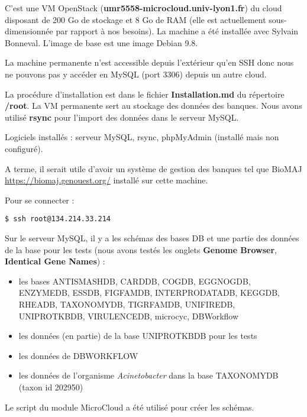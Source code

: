 C'est une VM OpenStack (\textbf{umr5558-microcloud.univ-lyon1.fr}) du cloud  disposant de 200 Go de stockage et 8 Go de RAM (elle est actuellement sous-dimensionnée par rapport à nos besoins). La machine a été installée avec Sylvain Bonneval. L'image de base est une image Debian 9.8.

La machine permanente n'est accessible depuis l'extérieur qu'en SSH donc nous ne pouvons pas y accéder en MySQL (port 3306) depuis un autre cloud.
\newline

La procédure d'installation est dans le fichier \textbf{Installation.md} du répertoire \textbf{/root}. La VM permanente sert au stockage des données des banques. Nous avons utilisé \textbf{rsync} pour l'import des données dans le serveur MySQL.
\newline

Logiciels installés : serveur MySQL, rsync, phpMyAdmin (installé mais non configuré). 
\newline

A terme, il serait utile d'avoir un système de gestion des banques tel que BioMAJ \url{https://biomaj.genouest.org/} installé sur cette machine.

Pour se connecter : 
\begin{lstlisting}[style=bash]
$ ssh root@134.214.33.214
\end{lstlisting}
\bigskip

Sur le serveur MySQL, il y a les schémas des bases DB et une partie des données de la base pour les tests (nous avons testés les onglets \textbf{Genome Browser}, \textbf{Identical Gene Names}) :
\begin{itemize}
	\item les bases ANTISMASHDB, CARDDB, COGDB, EGGNOGDB, ENZYMEDB, ESSDB, FIGFAMDB, INTERPRODATADB, KEGGDB, RHEADB, TAXONOMYDB, TIGRFAMDB, UNIFIREDB, UNIPROTKBDB, VIRULENCEDB, microcyc, DBWorkflow
	\item les données (en partie) de la base UNIPROTKBDB pour les tests
	\item les données de DBWORKFLOW
	\item les données de l'organisme \textit{Acinetobacter} dans la base TAXONOMYDB (taxon id 202950)
\end{itemize}

Le script  du module MicroCloud a été utilisé pour créer les schémas.
\newline

